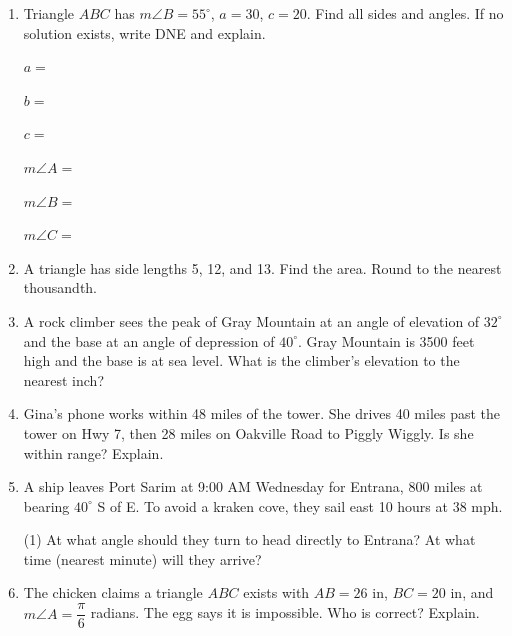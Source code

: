 \begin{enumerate}[leftmargin=*, label=\textbf{\arabic*.}, resume]
  $a = $ \blank

  $b = $ \blank

  $c = $ \blank

  $m\angle A = $ \blank

  $m\angle B = $ \blank

  $m\angle C = $ \blank
  \vgappp



  \newpage
  \item Triangle $ABC$ has $m\angle B = 55^{\circ}$, $a = 30$, $c = 20$. Find all sides and angles. If no solution exists, write DNE and explain. 

  $a = $ \blank

  $b = $ \blank

  $c = $ \blank

  $m\angle A = $ \blank

  $m\angle B = $ \blank

  $m\angle C = $ \blank
  \vgappp

  \item A triangle has side lengths 5, 12, and 13. Find the area. Round to the nearest thousandth. 
  \vgappp

  \item A rock climber sees the peak of Gray Mountain at an angle of elevation of $32^{\circ}$ and the base at an angle of depression of $40^{\circ}$. Gray Mountain is 3500 feet high and the base is at sea level. What is the climber's elevation to the nearest inch? 
  \vgappp



  \newpage
  \item Gina's phone works within 48 miles of the tower. She drives 40 miles past the tower on Hwy 7, then 28 miles on Oakville Road to Piggly Wiggly. Is she within range? Explain. 
  \vgappp

  \item A ship leaves Port Sarim at 9:00 AM Wednesday for Entrana, 800 miles at bearing $40^{\circ}$ S of E. To avoid a kraken cove, they sail east 10 hours at 38 mph. 

  \begin{tasks}(1)
    \task At what angle should they turn to head directly to Entrana? \blank
    \task At what time (nearest minute) will they arrive? \blank
  \end{tasks}
  \vgappp

  \item The chicken claims a triangle $ABC$ exists with $AB = 26$ in, $BC = 20$ in, and $m\angle A = \dfrac{\pi}{6}$ radians. The egg says it is impossible. Who is correct? Explain. 
  \vgappp



\end{enumerate}
